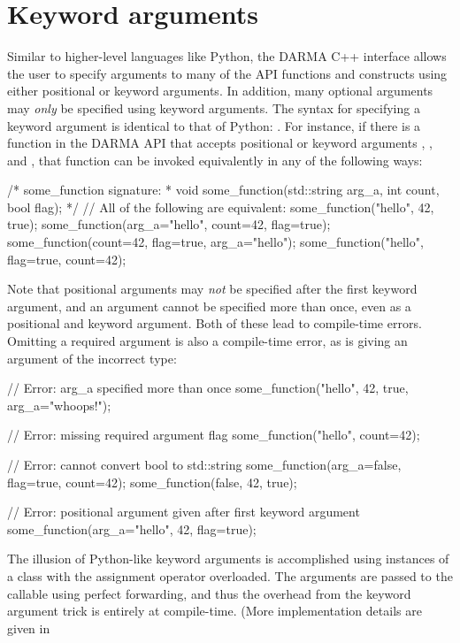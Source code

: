 \section{Keyword arguments}
\label{sec:keyword}


Similar to higher-level languages like Python, the DARMA C++ interface allows the user
to specify arguments to many of the API functions and constructs using either positional
or keyword arguments. In addition, many optional arguments may {\em only} be specified using
keyword arguments. The syntax for specifying a keyword argument is identical to that
of Python: .  For instance, if there is 
a function  in the DARMA API that accepts 
positional or keyword arguments , 
, and , that function can be invoked 
equivalently in any of the following ways:
\begin{CppCode}
/* some_function signature:
 *  void some_function(std::string arg_a, int count, bool flag);
 */
// All of the following are equivalent:
some_function("hello", 42, true);
some_function(arg_a="hello", count=42, flag=true);
some_function(count=42, flag=true, arg_a="hello");
some_function("hello", flag=true, count=42);
\end{CppCode}
Note that positional arguments may {\em not} be specified after the first keyword argument,
and an argument cannot be specified more than once, even as a positional and keyword
argument.  Both of these lead to compile-time errors. Omitting a required argument is 
also a compile-time error, as is giving an argument of the incorrect type: 
\begin{CppCode}
// Error: arg_a specified more than once
some_function("hello", 42, true, arg_a="whoops!");

// Error: missing required argument flag
some_function("hello", count=42);

// Error: cannot convert bool to std::string
some_function(arg_a=false, flag=true, count=42);
some_function(false, 42, true);

// Error: positional argument given after first keyword argument
some_function(arg_a="hello", 42, flag=true);
\end{CppCode}
The illusion of Python-like keyword arguments is accomplished 
using  instances
of a class with the assignment operator overloaded.  The arguments are passed to the 
callable using perfect forwarding, and thus the overhead from the keyword argument 
trick is entirely at compile-time.  (More implementation details are given in

